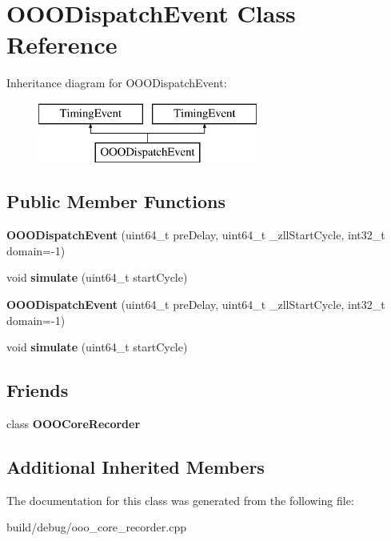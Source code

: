 \hypertarget{classOOODispatchEvent}{\section{O\-O\-O\-Dispatch\-Event Class Reference}
\label{classOOODispatchEvent}
}
Inheritance diagram for O\-O\-O\-Dispatch\-Event\-:\begin{figure}[H]
\begin{center}
\leavevmode
\includegraphics[height=2.000000cm]{classOOODispatchEvent}
\end{center}
\end{figure}
\subsection*{Public Member Functions}
\begin{DoxyCompactItemize}
\item 
\hypertarget{classOOODispatchEvent_acf0ff41bc3c46f659422e95fe1af424c}{{\bfseries O\-O\-O\-Dispatch\-Event} (uint64\-\_\-t pre\-Delay, uint64\-\_\-t \-\_\-zll\-Start\-Cycle, int32\-\_\-t domain=-\/1)}\label{classOOODispatchEvent_acf0ff41bc3c46f659422e95fe1af424c}

\item 
\hypertarget{classOOODispatchEvent_a15215c9212225accdd1b61ef01067d12}{void {\bfseries simulate} (uint64\-\_\-t start\-Cycle)}\label{classOOODispatchEvent_a15215c9212225accdd1b61ef01067d12}

\item 
\hypertarget{classOOODispatchEvent_acf0ff41bc3c46f659422e95fe1af424c}{{\bfseries O\-O\-O\-Dispatch\-Event} (uint64\-\_\-t pre\-Delay, uint64\-\_\-t \-\_\-zll\-Start\-Cycle, int32\-\_\-t domain=-\/1)}\label{classOOODispatchEvent_acf0ff41bc3c46f659422e95fe1af424c}

\item 
\hypertarget{classOOODispatchEvent_a15215c9212225accdd1b61ef01067d12}{void {\bfseries simulate} (uint64\-\_\-t start\-Cycle)}\label{classOOODispatchEvent_a15215c9212225accdd1b61ef01067d12}

\end{DoxyCompactItemize}
\subsection*{Friends}
\begin{DoxyCompactItemize}
\item 
\hypertarget{classOOODispatchEvent_ab288e24cc9cca52ebb627d4c18aaa2fa}{class {\bfseries O\-O\-O\-Core\-Recorder}}\label{classOOODispatchEvent_ab288e24cc9cca52ebb627d4c18aaa2fa}

\end{DoxyCompactItemize}
\subsection*{Additional Inherited Members}


The documentation for this class was generated from the following file\-:\begin{DoxyCompactItemize}
\item 
build/debug/ooo\-\_\-core\-\_\-recorder.\-cpp\end{DoxyCompactItemize}
